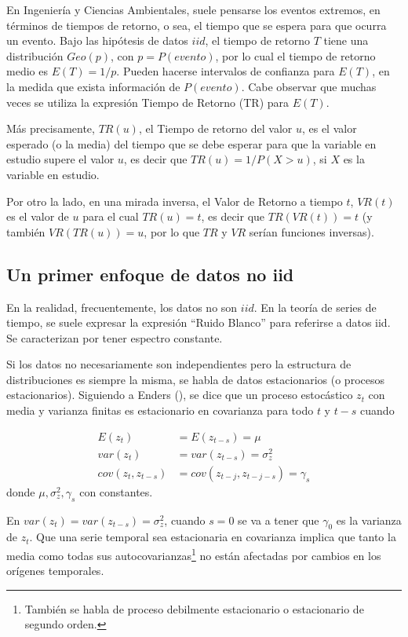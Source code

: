 \documentclass[
  12pt]{article}
\begin{document}
En Ingeniería y Ciencias Ambientales, suele pensarse los eventos
extremos, en términos de tiempos de retorno, o sea, el tiempo que se
espera para que ocurra un evento. Bajo las hipótesis de datos \(iid\),
el tiempo de retorno \(T\) tiene una distribución \(Geo(p)\), con
\(p = P(evento)\), por lo cual el tiempo de retorno medio es
\(E(T)=1/p\). Pueden hacerse intervalos de confianza para \(E(T)\), en
la medida que exista información de \(P(evento)\). Cabe observar que
muchas veces se utiliza la expresión Tiempo de Retorno (TR) para
\(E(T)\).

Más precisamente, \(TR(u)\), el Tiempo de retorno del valor \(u\), es el
valor esperado (o la media) del tiempo que se debe esperar para que la
variable en estudio supere el valor \(u\), es decir que
\(TR(u) = 1/P(X>u)\), si \(X\) es la variable en estudio.

Por otro la lado, en una mirada inversa, el Valor de Retorno a tiempo
\(t\), \(VR(t)\) es el valor de \(u\) para el cual \(TR(u)=t\), es decir
que \(TR(VR(t))=t\) (y también \(VR(TR(u))=u\), por lo que \(TR\) y
\(VR\) serían funciones inversas).

\subsection{Un primer enfoque de datos no
iid}\label{un-primer-enfoque-de-datos-no-iid}

En la realidad, frecuentemente, los datos no son \(iid\). En la teoría
de series de tiempo, se suele expresar la expresión ``Ruido Blanco''
para referirse a datos iid. Se caracterizan por tener espectro
constante.

Si los datos no necesariamente son independientes pero la estructura de
distribuciones es siempre la misma, se habla de datos estacionarios (o
procesos estacionarios). Siguiendo a Enders
(), se dice que un proceso estocástico
\(z_{t}\) con media y varianza finitas es estacionario en covarianza
para todo \(t\) y \(t-s\) cuando

\begin{align}
    \label{eq:2_7}
    E(z_{t})&=E(z_{t-s})=\mu\\
    \label{2_8}
    var(z_t)&=var(z_{t-s})=\sigma^2_z\\
    \label{2_9}
    cov(z_t,z_{t-s})&=cov(z_{t-j},z_{t-j-s})=\gamma_s
\end{align} donde \(\mu, \sigma^2_z, \gamma_s\) con constantes.

En \(var(z_t)=var(z_{t-s})=\sigma^2_z\), cuando \(s=0\) se va a tener
que \(\gamma_0\) es la varianza de \(z_t\). Que una serie temporal sea
estacionaria en covarianza implica que tanto la media como todas sus
autocovarianzas\footnote{También se habla de proceso debilmente estacionario o estacionario de segundo orden.}
no están afectadas por cambios en los orígenes temporales.
\end{document}
